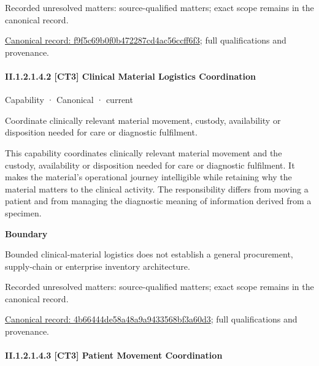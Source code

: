 {\small Recorded unresolved matters: source-qualified matters; exact scope remains in the canonical record.}\par
{\footnotesize \href{../../../../../../../continuum/strategy/capability/f9f5c69b0f0b472287cd4ac56ccff6f3.md}{Canonical record: f9f5c69b0f0b472287cd4ac56ccff6f3}; full qualifications and provenance.}\par
\paragraph*{II.1.2.1.4.2 [CT3] Clinical Material Logistics Coordination}
\label{navigation:II.1.2.1.4.2}

\label{element:4b66444de58a48a9a9433568bf3a60d3}
{\small Capability · Canonical · current}\par

Coordinate clinically relevant material movement, custody, availability or disposition needed for care or diagnostic fulfilment.



This capability coordinates clinically relevant material movement and the custody, availability or disposition needed for care or diagnostic fulfilment. It makes the material's operational journey intelligible while retaining why the material matters to the clinical activity. The responsibility differs from moving a patient and from managing the diagnostic meaning of information derived from a specimen.



\textbf{Boundary}



Bounded clinical-material logistics does not establish a general procurement, supply-chain or enterprise inventory architecture.


{\small Recorded unresolved matters: source-qualified matters; exact scope remains in the canonical record.}\par
{\footnotesize \href{../../../../../../../continuum/strategy/capability/4b66444de58a48a9a9433568bf3a60d3.md}{Canonical record: 4b66444de58a48a9a9433568bf3a60d3}; full qualifications and provenance.}\par
\paragraph*{II.1.2.1.4.3 [CT3] Patient Movement Coordination}
\label{navigation:II.1.2.1.4.3}


